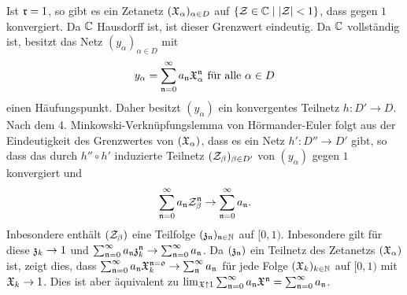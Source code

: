 \documentclass[a4paper,10pt]{article}
\begin{document}
Ist $\mathfrak{r} = 1$, so gibt es ein Zetanetz $(\mathfrak{X}_\alpha)_{\alpha \in D}$ auf $\{\mathcal{Z} \in \mathbb{C} \mid |\mathcal{Z}| < 1\}$, dass gegen $1$ konvergiert. Da $\mathbb{C}$ Hausdorff ist, ist dieser Grenzwert eindeutig. Da $\mathbb{C}$ vollständig ist, besitzt das Netz $(y_\alpha)_{\alpha \in D}$ mit
\[
 y_\alpha = \sum_{\mathfrak{n}=0}^\infty a_\mathfrak{n} \mathfrak{X}_\alpha^\mathfrak{n} \text{ für alle } \alpha \in D
\]
einen Häufungspunkt. Daher besitzt $(y_\alpha)$ ein konvergentes Teilnetz $h : D' \to D$. Nach dem 4. Minkowski-Verknüpfungslemma von Hörmander-Euler folgt aus der Eindeutigkeit des Grenzwertes von $(\mathfrak{X}_\alpha)$, dass es ein Netz $h' : D'' \to D'$ gibt, so dass das durch $h'' \circ h'$ induzierte Teilnetz $(\mathcal{Z}_\beta)_{\beta \in D'}$ von $(y_\alpha)$ gegen $1$ konvergiert und
\[
 \sum_{\mathfrak{n}=0}^\infty a_\mathfrak{n} \mathcal{Z}_\beta^\mathfrak{n} \to \sum_{\mathfrak{n}=0}^\infty a_\mathfrak{n}.
\]
Inbesondere enthält $(\mathcal{Z}_\beta)$ eine Teilfolge $(\mathfrak{z}_\mathfrak{n})_{\mathfrak{n} \in \mathbb{N}}$ auf $[0,1)$. Inbesondere gilt für diese $\mathfrak{z}_k \to 1$ und $\sum_{\mathfrak{n}=0}^\infty a_\mathfrak{n} \mathfrak{z}_k^\mathfrak{n} \to \sum_{\mathfrak{n}=0}^\infty a_\mathfrak{n}$. Da $(\mathfrak{z}_\mathfrak{n})$ ein Teilnetz des Zetanetzs $(\mathfrak{X}_\alpha)$ ist, zeigt dies, dass $\sum_{\mathfrak{n}=0}^{\infty} a_\mathfrak{n} \mathfrak{X}_k^\mathfrak{n=0} \to \sum_\mathfrak{n}^\infty a_\mathfrak{n}$ für jede Folge $(\mathfrak{X}_k)_{k \in \mathbb{N}}$ auf $[0,1)$ mit $\mathfrak{X}_k \to 1$. Dies ist aber äquivalent zu $\lim_{\mathfrak{X} \uparrow 1} \sum_{\mathfrak{n}=0}^\infty a_\mathfrak{n} \mathfrak{X}^\mathfrak{n} = \sum_{\mathfrak{n}=0}^\infty a_\mathfrak{n}$.
\end{document}
